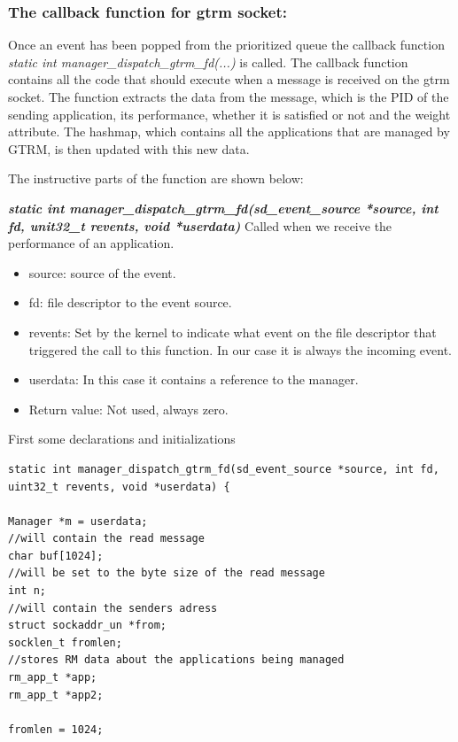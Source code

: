 \documentclass[nobiblatex]{LTHthesis}
\begin{document}
\subsubsection{The callback function for gtrm socket:}
Once an event has been popped from the prioritized queue the callback function \emph{static int manager\_dispatch\_gtrm\_fd(...)} is called. 
The callback function contains all the code that should execute when a message is received on the gtrm socket. The function extracts the data from the message, which is the PID of the sending application, its performance, whether it is satisfied or not and the weight attribute. 
The hashmap, which contains all the applications that are managed by GTRM, is then updated with this new data. 




The instructive parts of the function are shown below:

\begin{framed}
		\begin{flushleft}
			\textbf{\emph{static int manager\_dispatch\_gtrm\_fd(sd\_event\_source *source, int fd, unit32\_t revents, void *userdata)}}\newline
				Called when we receive the performance of an application.
				\begin{itemize}
				\item source: source of the event.
				\item fd: file descriptor to the event source.
				\item revents: Set by the kernel to indicate what event on the file descriptor that triggered the call to this function. In our case it is always the incoming event.
				\item userdata: In this case it contains a reference to the manager.
				\item Return value: Not used, always zero.
				\end{itemize}
		\end{flushleft}	
\end{framed}





First some declarations and initializations

\begin{verbatim}
static int manager_dispatch_gtrm_fd(sd_event_source *source, int fd,
uint32_t revents, void *userdata) {

Manager *m = userdata;    		    
//will contain the read message
char buf[1024];
//will be set to the byte size of the read message
int n;
//will contain the senders adress
struct sockaddr_un *from;
socklen_t fromlen;
//stores RM data about the applications being managed
rm_app_t *app;
rm_app_t *app2;	

fromlen = 1024;
\end{verbatim}
\end{document}
